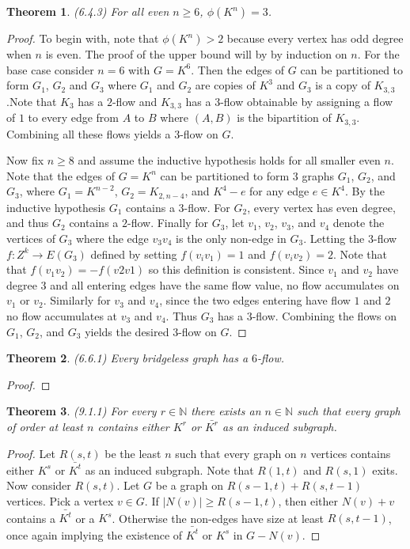 \documentclass[12pt]{article}
\newtheorem{theorem}{Theorem}
\begin{document}
\begin{theorem} (6.4.3) For all even $n \geq 6$, $\phi(K^n) = 3$.
\end{theorem}
\begin{proof} To begin with, note that $\phi(K^n) > 2$ because every
  vertex has odd degree when $n$ is even. The proof of the upper bound
  will by by induction on $n$. For the base case consider $n = 6$ with
  $G = K^6$. Then the edges of $G$ can be partitioned to form $G_1$,
  $G_2$ and $G_3$ where $G_1$ and $G_2$ are copies of $K^3$ and $G_3$
  is a copy of $K_{3,3}$.Note that $K_3$ has a $2$-flow and $K_{3,3}$
  has a $3$-flow obtainable by assigning a flow of $1$ to every edge
  from $A$ to $B$ where $(A,B)$ is the bipartition of
  $K_{3,3}$. Combining all these flows yields a $3$-flow on $G$.

  Now fix $n \geq 8$ and assume the inductive hypothesis holds for all
  smaller even $n$. Note that the edges of $G = K^n$ can be
  partitioned to form $3$ graphs $G_1$, $G_2$, and $G_3$, where
  $G_1 = K^{n - 2}$, $G_2 = K_{2, n - 4}$, and $K^4 - e$ for any edge
  $e \in K^4$. By the inductive hypothesis $G_1$ contains a
  $3$-flow. For $G_2$, every vertex has even degree, and thus $G_2$
  contains a $2$-flow. Finally for $G_3$, let $v_1$, $v_2$, $v_3$, and
  $v_4$ denote the vertices of $G_3$ where the edge $v_3 v_4$ is the
  only non-edge in $G_3$. Letting the $3$-flow $f:Z^k \to E(G_3)$
  defined by setting $f(v_i v_1) = 1$ and $f(v_i v_2) = 2$. Note that
  that $f(v_1v_2) = -f(v2 v1)$ so this definition is consistent. Since
  $v_1$ and $v_2$ have degree $3$ and all entering edges have the same
  flow value, no flow accumulates on $v_1$ or $v_2$. Similarly for
  $v_3$ and $v_4$, since the two edges entering have flow $1$ and $2$
  no flow accumulates at $v_3$ and $v_4$. Thus $G_3$ has a
  $3$-flow. Combining the flows on $G_1$, $G_2$, and $G_3$ yields the
  desired $3$-flow on $G$.
\end{proof}

\begin{theorem} (6.6.1) Every bridgeless graph has a $6$-flow.
\end{theorem}
\begin{proof}
\end{proof}

\begin{theorem} (9.1.1) For every $r \in \mathbb{N}$ there exists an
  $n \in \mathbb{N}$ such that every graph of order at least $n$
  contains either $K^r$ or $\bar{K^r}$ as an induced subgraph.
\end{theorem}
\begin{proof} Let $R(s,t)$ be the least $n$ such that every graph on
  $n$ vertices contains either $K^s$ or $\bar{K^t}$ as an induced
  subgraph. Note that $R(1,t)$ and $R(s, 1)$ exits. Now consider
  $R(s,t)$. Let $G$ be a graph on $R(s-1, t) + R(s, t-1)$
  vertices. Pick a vertex $v \in G$. If $|N(v)| \geq R(s - 1, t)$,
  then either $N(v) + v$ contains a $\bar{K^t}$ or a
  $K^{s}$. Otherwise the non-edges have size at least $R(s, t - 1)$,
  once again implying the existence of $\bar{K^t}$ or $K^s$ in
  $G - N(v)$.
\end{proof}
\end{document}
